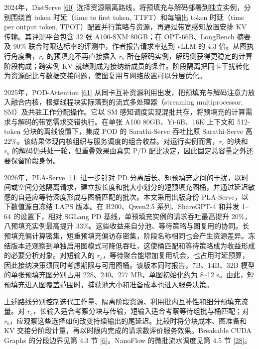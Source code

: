 \documentclass[UTF8,10.5pt,fontset=windows]{ctexart}
\begin{document}
2024年，DistServe {[}\protect\hyperlink{ref-zhong2024distserve}{60}{]}
选择资源隔离路线，将预填充与解码部署到独立实例，分别围绕首 token
时延（time to first token, TTFT）和每输出 token 时延（time per output
token, TPOT）配置并行策略与资源，再通过带宽感知放置安排 KV
传输。其评测平台包含 32 张 A100-SXM 80GB；在 OPT-66B、LongBench 摘要及
90\% 联合时限达标率的评测中，作者报告请求率达到 vLLM 的 4.3
倍。从图执行角度看，\(r_c\) 的预填充不再直接插入 \(r_b\)
所在解码实例，解码侧获得更稳定的计算阶段构成；跨实例 KV
就绪则成为接纳新成员的条件。阶段隔离把同卡干扰转化为资源配比与数据交接问题，使图复用与网络放置可以分层优化。

2025年，POD-Attention {[}\protect\hyperlink{ref-kamath2025pod}{61}{]}
从同卡互补资源利用出发，把预填充与解码注意力放入融合内核，根据线程块实际落到的流式多处理器（streaming
multiprocessor, SM）及共驻工作分配操作。它以 SM
感知调度实现混批共存，将预填充的计算需求与解码的带宽需求交错执行。在单张
A100 80GB、Yi-6B、16K 上下文和 512-token 分块的离线设置下，集成 POD 的
Sarathi-Serve 吞吐比原 Sarathi-Serve 高
22\%。该结果体现内核组织与服务调度的组合收益。对运行实例而言，\(r_c\)
的块和 \(r_b\) 的解码仍共处一轮，但重叠效果由真实 P/D
配比决定，因此固定总容量之外还要保留阶段身份。

2026年，PLA-Serve {[}\protect\hyperlink{ref-she2026plaserve}{11}{]}
进一步针对 PD
分离后长、短预填充之间的干扰，以时间或空间分池隔离请求，建立按长度和批大小划分的短预填充图桶，并通过延迟敏感的自适应等待深度形成与图桶匹配的批次。本文采用出版身份
PLA-Serve，以下数值源自冻结 LAPS 版本。在 H200、Qwen2.5 系列、ShareGPT-4
和并发 1--64 的设置下，相对 SGLang PD
基线，单预填充实例的请求吞吐最高提升 20\%，八预填充实例最高提升
33\%。这些收益来自分池、等待策略与图复用的协同。长预填充偏计算密集，短重预填充偏访存密集，阶段名称相同也会产生资源差异。冻结版本还观察到单独启用图模式可降低吞吐，这使桶匹配和等待策略成为收益形成的必要分析对象。对短输入的
\(r_c\)，等待聚合能增加复用机会，也占用时延预算，因此接纳决策须同时考虑期限与可用图桶。该版本同时报告，7B、14B、32B
模型的单张预填充图分别占用 228、240、277 MB，单图初始化约为 8--12
s。由此，短预填充进入图覆盖范围时，捕获池大小和准备成本也进入服务决策。

上述路线分别控制迭代工作量、隔离阶段资源、利用批内互补性和细分预填充流量。对
\(r_c\)，长输入适合考察分块与传输，短输入适合考察等待组批与桶匹配；对
\(r_b\)，应观察这些选择如何改变持续输出的尾延迟。比较时将分块成本、图准备和
KV 交接分阶段计量，再以时限内完成的请求数评价服务效果。Breakable CUDA
Graphs 的分段边界见第 4.3 节
{[}\protect\hyperlink{ref-lmsys2026breakable}{6}{]}。NanoFlow
的微批流水调度见第 4.5 节
{[}\protect\hyperlink{ref-zhu2025nanoflow}{28}{]}。
\end{document}
